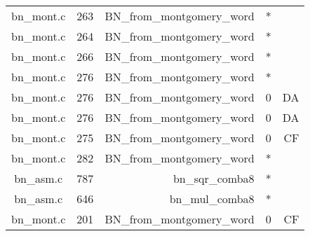 \begin{table}
\begin{tabular}{clrrr}
bn\_mont.c& 263&BN\_from\_montgomery\_word&*&\\
bn\_mont.c& 264&BN\_from\_montgomery\_word&*&\\
bn\_mont.c& 266&BN\_from\_montgomery\_word&*&\\
bn\_mont.c& 276&BN\_from\_montgomery\_word&*&\\
bn\_mont.c& 276&BN\_from\_montgomery\_word&0 &DA\\
bn\_mont.c& 276&BN\_from\_montgomery\_word&0 &DA\\
bn\_mont.c& 275&BN\_from\_montgomery\_word&0 &CF\\
bn\_mont.c& 282&BN\_from\_montgomery\_word&*&\\
bn\_asm.c& 787&bn\_sqr\_comba8&*&\\
bn\_asm.c& 646&bn\_mul\_comba8&*&\\
bn\_mont.c& 201&BN\_from\_montgomery\_word&0 &CF\\
\hline
\end{tabular}
\end{table}
